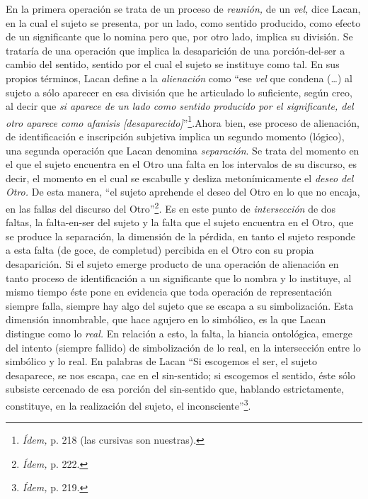 En la primera operación se trata de un proceso de \emph{reunión,} de un \emph{vel,} dice Lacan, en la cual el sujeto se presenta, por un lado, como sentido producido, como efecto de un significante que lo nomina pero que, por otro lado, implica su división\emph{.} Se trataría de una operación que implica la desaparición de una porción-del-ser a cambio del sentido, sentido por el cual el sujeto se instituye como tal. En sus propios términos, Lacan define a la \emph{alienación} como \enquote{ese \emph{vel} que condena (\dots) al sujeto a sólo aparecer en esa división que he articulado lo suficiente, según creo, al decir que \emph{si aparece de un lado como sentido producido por el significante, del otro aparece como afanisis {[}desaparecido{]}}}\footnote{\emph{Ídem,} p. 218 (las cursivas son nuestras).}.Ahora bien, ese proceso de alienación, de identificación e inscripción subjetiva implica un segundo momento (lógico), una segunda operación que Lacan denomina \emph{separación}. Se trata del momento en el que el sujeto encuentra en el Otro una falta en los intervalos de su discurso, es decir, el momento en el cual se escabulle y desliza metonímicamente el \emph{deseo del Otro.} De esta manera, \enquote{el sujeto aprehende el deseo del Otro en lo que no encaja, en las fallas del discurso del Otro\emph{}}\footnote{\emph{Ídem,} p. 222.}\emph{.} Es en este punto de \emph{intersección} de dos faltas, la falta-en-ser del sujeto y la falta que el sujeto encuentra en el Otro, que se produce la separación, la dimensión de la pérdida, en tanto el sujeto responde a esta falta (de goce, de completud) percibida en el Otro con su propia desaparición. Si el sujeto emerge producto de una operación de alienación en tanto proceso de identificación a un significante que lo nombra y lo instituye, al mismo tiempo éste pone en evidencia que toda operación de representación siempre falla, siempre hay algo del sujeto que se escapa a su simbolización. Esta dimensión innombrable, que hace agujero en lo simbólico, es la que Lacan distingue como lo \emph{real.} En relación a esto, la falta, la hiancia ontológica, emerge del intento (siempre fallido) de simbolización de lo real, en la intersección entre lo simbólico y lo real. En palabras de Lacan \enquote{Si escogemos el ser, el sujeto desaparece, se nos escapa, cae en el sin-sentido; si escogemos el sentido, éste sólo subsiste cercenado de esa porción del sin-sentido que, hablando estrictamente, constituye, en la realización del sujeto, el inconsciente}\footnote{\emph{Ídem,} p. 219.}.

